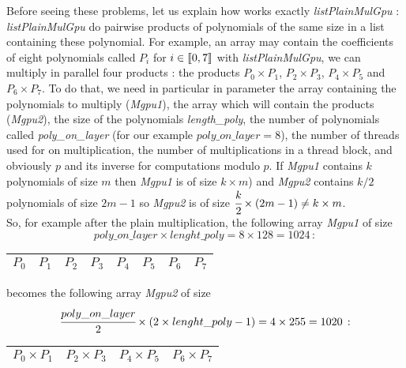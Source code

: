 Before seeing these problems, let us explain how works exactly \textit{listPlainMulGpu} :\\

\textit{listPlainMulGpu} do pairwise products of polynomials of the same size in a list containing these polynomial. For example, an array may contain the coefficients of eight polynomials called $P_i$ for $i\in \mbox{\textlbrackdbl} 0, 7\mbox{\textrbrackdbl}$ with \textit{listPlainMulGpu}, we can multiply in parallel four products : the products $P_0\times P_1$, $P_2\times P_3$, $P_4\times P_5$ and $P_6\times P_7$. To do that, we need in particular in parameter the array containing the polynomials to multiply (\textit{Mgpu1}), the array which will contain the products (\textit{Mgpu2}), the size of the polynomials \textit{length\_poly}, the number of polynomials called \textit{poly\_on\_layer} (for our example $poly\_on\_layer=8$), the number of threads used for on multiplication, the number of multiplications in a thread block, and obviously $p$ and its inverse for computations modulo $p$. If \textit{Mgpu1} contains $k$ polynomials of size $m$ then \textit{Mgpu1} is of size $k\times m$) and \textit{Mgpu2} contains $k/2$ polynomials of size $2m-1$ so \textit{Mgpu2} is of size $\cfrac{k}{2}\times (2m-1)\neq k\times m$.\\

So, for example after the plain multiplication, the following array \textit{Mgpu1} of size\\
$$poly\_on\_layer \times lenght\_poly = 8 \times 128 = 1024\,:$$

\begin{center}
\begin{tabular}{|c|c||c|c||c|c||c|c|}
\hline
$P_0$ & $P_1$ & $P_2$ & $P_3$ & $P_4$ & $P_5$ & $P_6$ & $P_7$ \\
\hline
\end{tabular}
\end{center}

becomes the following array \textit{Mgpu2} of size\\
$$\cfrac{poly\_on\_layer}{2} \times (2\times lenght\_poly - 1) = 4 \times 255 = 1020\,:$$

\begin{center}
\begin{tabular}{|c|c|c|c|}
\hline
$P_0 \times P_1$ & $P_2 \times P_3$ & $P_4 \times P_5$ & $P_6 \times P_7$ \\
\hline
\end{tabular}\\
\end{center}

